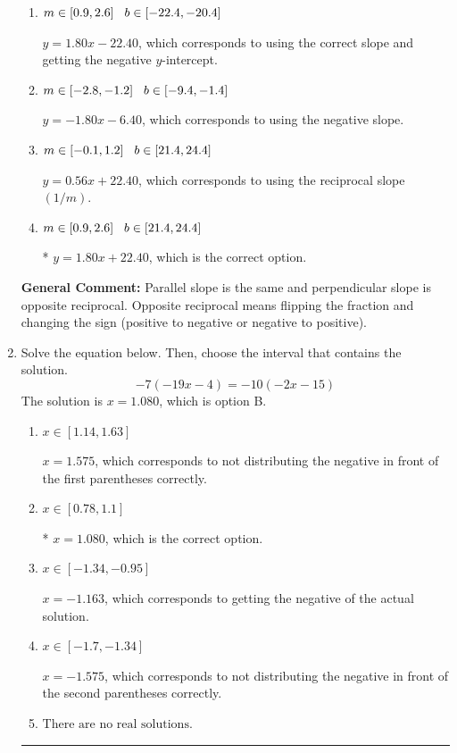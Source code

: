 \documentclass{extbook}[14pt]
\newcommand{\litem}[1]{\item #1

\rule{\textwidth}{0.4pt}}
\begin{document}
\begin{enumerate}
{\begin{enumerate}[label=\Alph*.]
 $y = 1.80x + 16.00$, which corresponds to correct slope and mis-distributing while simplifying to slope-intercept form.
\item \( m \in [0.9, 2.6] \hspace*{3mm} b \in [-22.4, -20.4] \)

 $y = 1.80x - 22.40$, which corresponds to using the correct slope and getting the negative $y$-intercept.
\item \( m \in [-2.8, -1.2] \hspace*{3mm} b \in [-9.4, -1.4] \)

 $y = -1.80x - 6.40$, which corresponds to using the negative slope.
\item \( m \in [-0.1, 1.2] \hspace*{3mm} b \in [21.4, 24.4] \)

 $y = 0.56x + 22.40$, which corresponds to using the reciprocal slope $(1/m)$.
\item \( m \in [0.9, 2.6] \hspace*{3mm} b \in [21.4, 24.4] \)

* $y = 1.80x + 22.40$, which is the correct option.
\end{enumerate}

\textbf{General Comment:} Parallel slope is the same and perpendicular slope is opposite reciprocal. Opposite reciprocal means flipping the fraction and changing the sign (positive to negative or negative to positive).
}
\litem{
Solve the equation below. Then, choose the interval that contains the solution.
\[ -7(-19x -4) = -10(-2x -15) \]The solution is \( x = 1.080 \), which is option B.\begin{enumerate}[label=\Alph*.]
\item \( x \in [1.14, 1.63] \)

$x = 1.575$, which corresponds to not distributing the negative in front of the first parentheses correctly.
\item \( x \in [0.78, 1.1] \)

* $x = 1.080$, which is the correct option.
\item \( x \in [-1.34, -0.95] \)

$x = -1.163$, which corresponds to getting the negative of the actual solution.
\item \( x \in [-1.7, -1.34] \)

$x = -1.575$, which corresponds to not distributing the negative in front of the second parentheses correctly.
\item \( \text{There are no real solutions.} \)


\end{enumerate}}
\end{enumerate}
\end{document}
